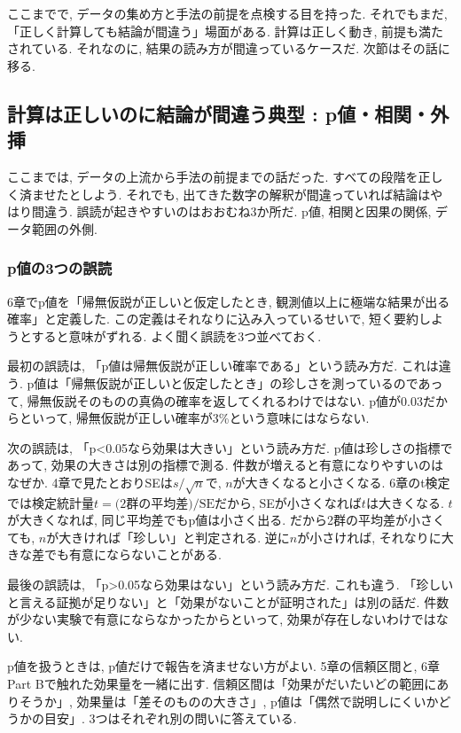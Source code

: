 ここまでで, データの集め方と手法の前提を点検する目を持った.
それでもまだ, 「正しく計算しても結論が間違う」場面がある.
計算は正しく動き, 前提も満たされている. それなのに, 結果の読み方が間違っているケースだ.
次節はその話に移る.


\subsection{計算は正しいのに結論が間違う典型 : p値・相関・外挿}

ここまでは, データの上流から手法の前提までの話だった.
すべての段階を正しく済ませたとしよう.
それでも, 出てきた数字の解釈が間違っていれば結論はやはり間違う.
誤読が起きやすいのはおおむね3か所だ. p値, 相関と因果の関係, データ範囲の外側.

\subsubsection*{p値の3つの誤読}

6章でp値を「帰無仮説が正しいと仮定したとき, 観測値以上に極端な結果が出る確率」と定義した.
この定義はそれなりに込み入っているせいで, 短く要約しようとすると意味がずれる.
よく聞く誤読を3つ並べておく.

最初の誤読は, 「p値は帰無仮説が正しい確率である」という読み方だ.
これは違う. p値は「帰無仮説が正しいと仮定したとき」の珍しさを測っているのであって, 帰無仮説そのものの真偽の確率を返してくれるわけではない.
p値が0.03だからといって, 帰無仮説が正しい確率が3\%という意味にはならない.

次の誤読は, 「p<0.05なら効果は大きい」という読み方だ.
p値は珍しさの指標であって, 効果の大きさは別の指標で測る.
件数が増えると有意になりやすいのはなぜか.
4章で見たとおりSEは$s/\sqrt{n}$で, $n$が大きくなると小さくなる.
6章のt検定では検定統計量$t = \text{(2群の平均差)}/\text{SE}$だから, SEが小さくなれば$t$は大きくなる.
$t$が大きくなれば, 同じ平均差でもp値は小さく出る.
だから2群の平均差が小さくても, $n$が大きければ「珍しい」と判定される.
逆に$n$が小さければ, それなりに大きな差でも有意にならないことがある.

最後の誤読は, 「p>0.05なら効果はない」という読み方だ.
これも違う. 「珍しいと言える証拠が足りない」と「効果がないことが証明された」は別の話だ.
件数が少ない実験で有意にならなかったからといって, 効果が存在しないわけではない.

p値を扱うときは, p値だけで報告を済ませない方がよい.
5章の信頼区間と, 6章Part Bで触れた効果量を一緒に出す.
信頼区間は「効果がだいたいどの範囲にありそうか」, 効果量は「差そのものの大きさ」, p値は「偶然で説明しにくいかどうかの目安」.
3つはそれぞれ別の問いに答えている.

